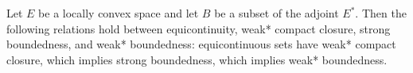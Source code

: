 Let $E$ be a locally convex space and let $B$ be a subset of the adjoint $E^{*}$. Then the following relations hold between equicontinuity, weak* compact closure, strong boundedness, and weak* boundedness: equicontinuous sets have weak* compact closure, which implies strong boundedness, which implies weak* boundedness.
